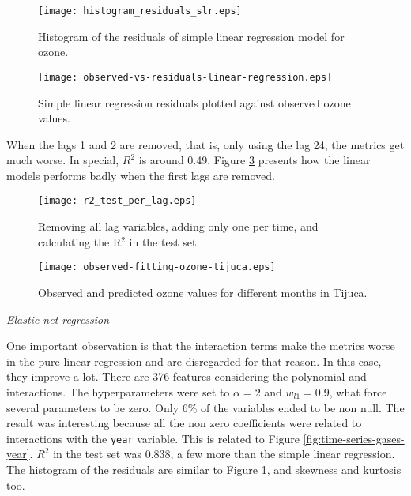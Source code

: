 \begin{figure}
    \centering
    \texttt{[image: histogram\_residuals\_slr.eps]}
    \caption{Histogram of the residuals of simple linear regression model for ozone.}
    \label{fig:histogram-residuals-slr}
\end{figure}

\begin{figure}[!ht]
    \centering
    \texttt{[image: observed-vs-residuals-linear-regression.eps]}
    \caption{Simple linear regression residuals plotted against
    observed ozone values.}
    \label{fig:observed-vs-residual-linear-regression}
\end{figure}

When the lags 1 and 2 are removed, that is, only using the lag 24, the metrics
get much worse. In special, $R^2$ is around 0.49. Figure \ref{fig:r2-test-lag}
presents how the linear models performs badly when the first lags are removed.


\begin{figure}[!ht]
    \centering
    \texttt{[image: r2\_test\_per\_lag.eps]}
    \caption{Removing all lag variables, adding only one per time, and calculating the R$^2$ in the test set.}
    \label{fig:r2-test-lag}
\end{figure}

\begin{figure*}[!ht]
    \centering
    \texttt{[image: observed-fitting-ozone-tijuca.eps]}
    \caption{Observed and predicted ozone values for different months in Tijuca.}
    \label{fig:observed-fitting-ozone-tijuca}
\end{figure*}

\vspace{2mm}

{\em Elastic-net regression}

\vspace{2mm}

One important observation is that the interaction terms make the metrics worse
in the pure linear regression and are disregarded for that reason. In this
case, they improve a lot. There are 376 features considering the polynomial
and interactions. The hyperparameters were set to $\alpha = 2$ and
$w_{l1} = 0.9$, what force several parameters to be zero. Only 6\% of the
variables ended to be non null. The result was interesting because all the non
zero coefficients were related to interactions with the {\tt year} variable.
This is related to Figure \ref{fig:time-series-gases-year}. $R^2$ in the test
set was 0.838, a few more than the simple linear regression. The histogram of
the residuals are similar to Figure \ref{fig:histogram-residuals-slr}, and
skewness and kurtosis too.

